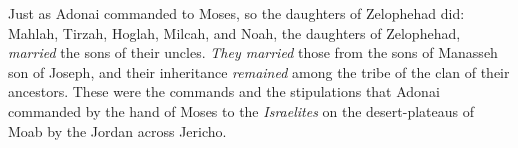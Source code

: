 \begin{biblechapter}
\verse Just as Adonai commanded to Moses, so the daughters of Zelophehad did:
\verse Mahlah, Tirzah, Hoglah, Milcah, and Noah, the daughters of Zelophehad, \textit{married} the sons of their uncles.
\verse \textit{They married} those from the sons of Manasseh son of Joseph, and their inheritance \textit{remained} among the tribe of the clan of their ancestors.
\verse These were the commands and the stipulations that Adonai commanded by the hand of Moses to the \textit{Israelites} on the desert-plateaus of Moab by the Jordan across Jericho.
\end{biblechapter}


